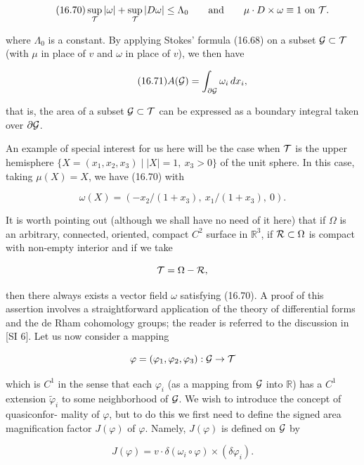 \begin{equation}\tag{16.70}
\sup_{\mathcal{T}}|\omega|+\sup_{\mathcal{T}}|D\omega|\leq \Lambda_0\qquad \text{and}\qquad \mu\cdot D\times \omega \equiv 1\text{ on }\mathcal{T}.
\end{equation}

where $\Lambda_0$ is a constant. By applying Stokes' formula (16.68) on a subset $\mathcal{G}\subset\mathcal{T}$
(with $\mu$ in place of $v$ and $\omega$ in place of $v$), we then have

\begin{equation}\tag{16.71}
A(\mathcal{G})=\int_{\partial\mathcal{G}}\omega_i\,dx_i,
\end{equation}

that is, the area of a subset $\mathcal{G}\subset\mathcal{T}$ can be expressed as a boundary integral taken
over $\partial\mathcal{G}$.

An example of special interest for us here will be the case when $\mathcal{T}$ is the upper
hemisphere $\{X=(x_1,x_2,x_3)\mid |X|=1,\ x_3>0\}$ of the unit sphere. In this case,
taking $\mu(X)=X$, we have (16.70) with

\[
\omega(X)=(-x_2/(1+x_3),\ x_1/(1+x_3),\ 0).
\]

It is worth pointing out (although we shall have no need of it here) that if $\Omega$ is an
arbitrary, connected, oriented, compact $C^2$ surface in $\mathbb{R}^3$, if $\mathcal{R}\subset\Omega$ is compact
with non-empty interior and if we take

\[
\mathcal{T}=\Omega-\mathcal{R},
\]

then there always exists a vector field $\omega$ satisfying (16.70). A proof of this assertion
involves a straightforward application of the theory of differential forms and the
de Rham cohomology groups; the reader is referred to the discussion in [SI 6].
Let us now consider a mapping

\[
\varphi=(\varphi_1,\varphi_2,\varphi_3):\mathcal{G}\to\mathcal{T}
\]

which is $C^1$ in the sense that each $\varphi_i$ (as a mapping from $\mathcal{G}$ into $\mathbb{R}$) has a $C^1$ extension
$\tilde\varphi_i$ to some neighborhood of $\mathcal{G}$. We wish to introduce the concept of quasiconfor-
mality of $\varphi$, but to do this we first need to define the signed area magnification factor
$J(\varphi)$ of $\varphi$. Namely, $J(\varphi)$ is defined on $\mathcal{G}$ by

\begin{equation}\tag{16.72}
J(\varphi)=v\cdot \delta(\omega_i\circ \varphi)\times (\delta\varphi_i).
\end{equation}

